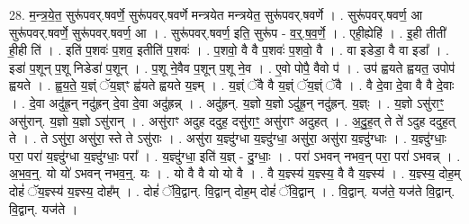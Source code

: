 \documentclass[17pt]{extarticle}
\begin{document}
28. म॒न्त्र॒ये॒त॒ सुरू॑पवर्.षवर्णे॒ सुरू॑पवर्.षवर्णे मन्त्रयेत मन्त्रयेत॒ सुरू॑पवर्.षवर्णे । . सुरू॑पवर्.षवर्ण॒ आ सुरू॑पवर्.षवर्णे॒ सुरू॑पवर्.षवर्ण॒ आ । . सुरू॑पवर्.षवर्ण॒ इति॒ सुरू॑प - व॒र्॒.ष॒व॒र्णे॒ । . एही॒ह्येहि॑ । . इ॒ही तीती॑ ही॒ही ति॑ । . इति॑ प॒शवः॑ प॒शव॒ इतीति॑ प॒शवः॑ । . प॒शवो॒ वै वै प॒शवः॑ प॒शवो॒ वै । . वा इडेडा॒ वै वा इडा᳚ । . इडा॑ प॒शून् प॒शू निडेडा॑ प॒शून् । . प॒शू ने॒वैव प॒शून् प॒शू ने॒व । . ए॒वो पोपै॒ वैवो प॑ । . उप॑ ह्वयते ह्वयत॒ उपोप॑ ह्वयते । . ह्व॒य॒ते॒ य॒ज्ञ्ं ॅय॒ज्ञ्ꣳ ह्व॑यते ह्वयते य॒ज्ञ्म् । . य॒ज्ञ्ं ॅवै वै य॒ज्ञ्ं ॅय॒ज्ञ्ं ॅवै । . वै दे॒वा दे॒वा वै वै दे॒वाः । . दे॒वा अदु॑ह्र॒न् नदु॑ह्रन् दे॒वा दे॒वा अदु॑ह्रन्न् । . अदु॑ह्रन्. य॒ज्ञो य॒ज्ञो ऽदु॑ह्र॒न् नदु॑ह्रन्. य॒ज्ञ्ः । . य॒ज्ञो ऽसु॑राꣳ॒॒ असु॑रान्. य॒ज्ञो य॒ज्ञो ऽसु॑रान् । . असु॑राꣳ अदुह ददुह॒ दसु॑राꣳ॒॒ असु॑राꣳ अदुहत् । . अ॒दु॒ह॒त् ते ते॑ ऽदुह ददुह॒त् ते । . ते ऽसु॑रा॒ असु॑रा॒ स्ते ते ऽसु॑राः । . असु॑रा य॒ज्ञ्दु॑ग्धा य॒ज्ञ्दु॑ग्धा॒ असु॑रा॒ असु॑रा य॒ज्ञ्दु॑ग्धाः । . य॒ज्ञ्दु॑ग्धाः॒ परा॒ परा॑ य॒ज्ञ्दु॑ग्धा य॒ज्ञ्दु॑ग्धाः॒ परा᳚ । . य॒ज्ञ्दु॑ग्धा॒ इति॑ य॒ज्ञ् - दु॒ग्धाः॒ । . परा॑ ऽभवन् नभव॒न् परा॒ परा॑ ऽभवन्न् । . अ॒भ॒व॒न्॒. यो यो॑ ऽभवन् नभव॒न्॒. यः । . यो वै वै यो यो वै । . वै य॒ज्ञ्स्य॑ य॒ज्ञ्स्य॒ वै वै य॒ज्ञ्स्य॑ । . य॒ज्ञ्स्य॒ दोह॒म् दोहं॑ ॅय॒ज्ञ्स्य॑ य॒ज्ञ्स्य॒ दोह᳚म् । . दोहं॑ ॅवि॒द्वान्. वि॒द्वान् दोह॒म् दोहं॑ ॅवि॒द्वान् । . वि॒द्वान्. यज॑ते॒ यज॑ते वि॒द्वान्. वि॒द्वान्. यज॑ते । \newline
\end{document}
